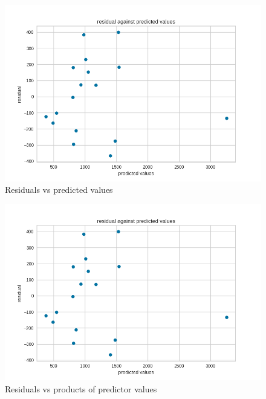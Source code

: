 \documentclass[12pt,twoside]{article}
\theoremstyle{definition}
\begin{document}
\begin{itemize}
\begin{figure}
\centering
\includegraphics[width=\textwidth]{predicted.png}
\caption{Residuals vs predicted values}
\label{figure:2}
\end{figure}

\begin{figure}
\centering
\includegraphics[width=\textwidth]{predicted.png}
\caption{Residuals vs products of predictor values}
\label{figure:3}
\end{figure}


\end{itemize}
\end{document}
